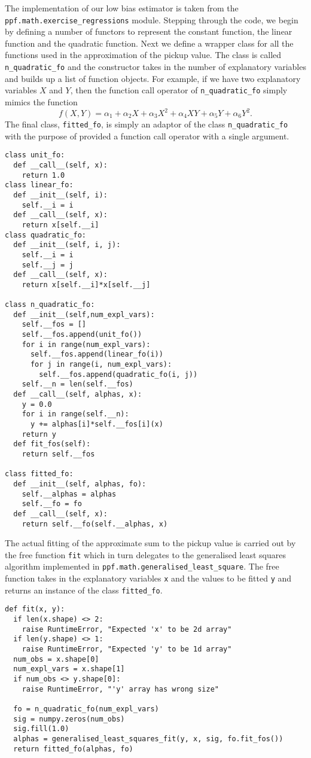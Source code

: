 The implementation of our low bias estimator is taken from the \\
\verb|ppf.math.exercise_regressions| module. Stepping through the
code, we begin by defining a number of functors to represent the
constant function, the linear function and the quadratic
function. Next we define a wrapper class for all the functions used in
the approximation of the pickup value. The class is called
\verb|n_quadratic_fo| and the constructor takes in the number of
explanatory variables and builds up a list of function objects. For
example, if we have two explanatory variables $X$ and $Y$, then the
function call operator of \verb|n_quadratic_fo| simply mimics the
function
\begin{equation}
f(X,Y) = \alpha_1 + \alpha_2 X + \alpha_3 X^2 + \alpha_4 XY + \alpha_5 Y + \alpha_6 Y^2.
\end{equation} 
The final class, \verb|fitted_fo|, is simply an adaptor of the class
\verb|n_quadratic_fo| with the purpose of provided a function call
operator with a single argument. 
\begin{verbatim}
class unit_fo:
  def __call__(self, x):
    return 1.0
class linear_fo:
  def __init__(self, i):
    self.__i = i
  def __call__(self, x):
    return x[self.__i]
class quadratic_fo:
  def __init__(self, i, j):
    self.__i = i
    self.__j = j
  def __call__(self, x):
    return x[self.__i]*x[self.__j]

class n_quadratic_fo:
  def __init__(self,num_expl_vars):
    self.__fos = []
    self.__fos.append(unit_fo())
    for i in range(num_expl_vars):
      self.__fos.append(linear_fo(i))
      for j in range(i, num_expl_vars):
        self.__fos.append(quadratic_fo(i, j))
    self.__n = len(self.__fos)
  def __call__(self, alphas, x):
    y = 0.0
    for i in range(self.__n):
      y += alphas[i]*self.__fos[i](x)
    return y
  def fit_fos(self):
    return self.__fos
   
class fitted_fo:
  def __init__(self, alphas, fo):
    self.__alphas = alphas
    self.__fo = fo
  def __call__(self, x):
    return self.__fo(self.__alphas, x)
\end{verbatim}
The actual fitting of the approximate
sum to the pickup value is carried out by the free function \verb|fit|
which in turn delegates to the generalised least squares algorithm
implemented in \verb|ppf.math.generalised_least_square|. The free
function takes in the explanatory variables \verb|x| and the values to
be fitted \verb|y| and returns an instance of the class
\verb|fitted_fo|. 
\begin{verbatim}
def fit(x, y):
  if len(x.shape) <> 2:
    raise RuntimeError, "Expected 'x' to be 2d array"
  if len(y.shape) <> 1:
    raise RuntimeError, "Expected 'y' to be 1d array"
  num_obs = x.shape[0]
  num_expl_vars = x.shape[1]
  if num_obs <> y.shape[0]:
    raise RuntimeError, "'y' array has wrong size"

  fo = n_quadratic_fo(num_expl_vars)
  sig = numpy.zeros(num_obs)  
  sig.fill(1.0)
  alphas = generalised_least_squares_fit(y, x, sig, fo.fit_fos())
  return fitted_fo(alphas, fo)
\end{verbatim}
